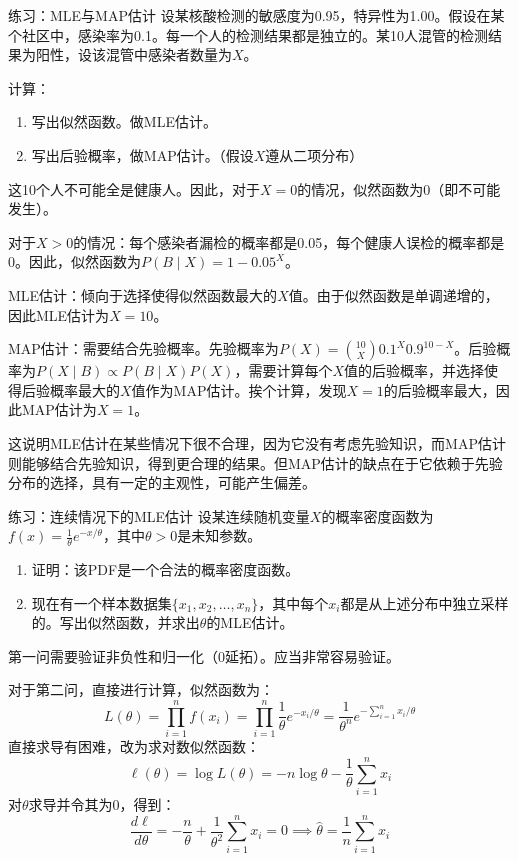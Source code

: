 \begin{example}{练习：MLE与MAP估计}{}
    设某核酸检测的敏感度为0.95，特异性为1.00。假设在某个社区中，感染率为0.1。每一个人的检测结果都是独立的。某10人混管的检测结果为阳性，设该混管中感染者数量为$X$。

    计算：
    \begin{enumerate}
        \item 写出似然函数。做MLE估计。
        \item 写出后验概率，做MAP估计。（假设$X$遵从二项分布）
    \end{enumerate}
    \tcblower

    这10个人不可能全是健康人。因此，对于$X=0$的情况，似然函数为0（即不可能发生）。

    对于$X>0$的情况：每个感染者漏检的概率都是0.05，每个健康人误检的概率都是0。因此，似然函数为$P(B \mid X) = 1 - 0.05^X$。

    MLE估计：倾向于选择使得似然函数最大的$X$值。由于似然函数是单调递增的，因此MLE估计为$X=10$。

    MAP估计：需要结合先验概率。先验概率为$P(X) = \binom{10}{X} 0.1^X 0.9^{10-X}$。后验概率为$P(X \mid B) \propto P(B \mid X) P(X)$，需要计算每个$X$值的后验概率，并选择使得后验概率最大的$X$值作为MAP估计。挨个计算，发现$X=1$的后验概率最大，因此MAP估计为$X=1$。

    这说明MLE估计在某些情况下很不合理，因为它没有考虑先验知识，而MAP估计则能够结合先验知识，得到更合理的结果。但MAP估计的缺点在于它依赖于先验分布的选择，具有一定的主观性，可能产生偏差。
\end{example}

\begin{example}{练习：连续情况下的MLE估计}{}
    设某连续随机变量$X$的概率密度函数为$f(x) = \frac{1}{\theta} e^{-x/\theta}$，其中$\theta > 0$是未知参数。

    \begin{enumerate}
        \item 证明：该PDF是一个合法的概率密度函数。
        \item 现在有一个样本数据集$\{x_1, x_2, \ldots, x_n\}$，其中每个$x_i$都是从上述分布中独立采样的。写出似然函数，并求出$\theta$的MLE估计。
    \end{enumerate}
    \tcblower

    第一问需要验证非负性和归一化（0延拓）。应当非常容易验证。

    对于第二问，直接进行计算，似然函数为：
    \begin{equation}
        L(\theta) = \prod_{i=1}^n f(x_i) = \prod_{i=1}^n \frac{1}{\theta} e^{-x_i/\theta} = \frac{1}{\theta^n} e^{-\sum_{i=1}^n x_i / \theta}
    \end{equation}
    直接求导有困难，改为求对数似然函数：
    \begin{equation}
        \ell(\theta) = \log L(\theta) = -n \log \theta - \frac{1}{\theta} \sum_{i=1}^n x_i
    \end{equation}
    对$\theta$求导并令其为0，得到：
    \begin{equation}\frac{d\ell}{d\theta} = -\frac{n}{\theta} + \frac{1}{\theta^2} \sum_{i=1}^n x_i = 0 \implies \hat{\theta} = \frac{1}{n} \sum_{i=1}^n x_i
    \end{equation}
\end{example}
